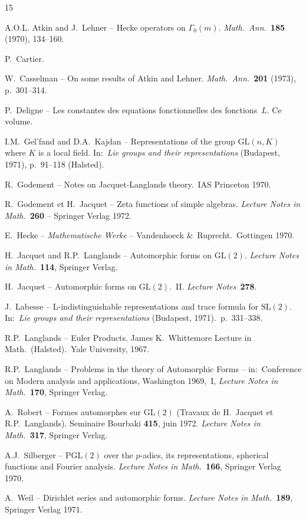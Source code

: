 \documentclass[12pt]{amsart}
\begin{document}
\begin{thebibliography}{15}

A.O.L. Atkin and J.~Lehner -- Hecke operators on $\Gamma_0(m)$.
\textit{Math.\ Ann.}\ \textbf{185} (1970), 134--160.

P.~Cartier.

W.~Casselman -- On some results of Atkin and Lehner.
\textit{Math.\ Ann.}\ \textbf{201} (1973), p.\ 301--314.

P.~Deligne -- Les constantes des equations fonctionnelles des fonctions~$L$.
Ce volume.

I.M.~Gel'fand and D.A.~Kajdan -- Representations of the group $\mathrm{GL}(n,K)$ where $K$ is a local field.
In:\ \textit{Lie groups and their representations} (Budapest, 1971), p.\ 91--118 (Halsted).

R.~Godement -- Notes on Jacquet-Langlands theory.\ IAS Princeton 1970.

R.~Godement et H.~Jacquet -- Zeta functions of simple algebras.
\textit{Lecture Notes in Math.}\ \textbf{260} -- Springer Verlag 1972.

E.~Hecke -- \textit{Mathematische Werke} -- Vandenhoeck \&\ Ruprecht.\ Gottingen 1970.

H.~Jacquet and R.P.~Langlands -- Automorphic forms on $\mathrm{GL}(2)$.
\textit{Lecture Notes in Math.}\ \textbf{114}, Springer Verlag.

H.~Jacquet -- Automorphic forms on $\mathrm{GL}(2)$.\ II.
\textit{Lecture Notes}\ \textbf{278}.

J.~Labesse -- L-indistinguishable representations and trace formula for $\mathrm{SL}(2)$.
In:\ \textit{Lie groups and their representations} (Budapest, 1971).\ p.\ 331--338.

R.P.~Langlands -- Euler Products.
James K.~Whittemore Lecture in Math.\ (Halsted).\ Yale University, 1967.

R.P.~Langlands -- Problems in the theory of Automorphic Forms -- in:\ Conference on Modern analysis and applications, Washington 1969,~I,
\textit{Lecture Notes in Math.}\ \textbf{170}, Springer Verlag.

A.~Robert -- Formes automorphes sur $\mathrm{GL}(2)$ (Travaux de H.~Jacquet et R.P.~Langlands).
Seminaire Bourbaki \textbf{415}, juin 1972.
\textit{Lecture Notes in Math.}\ \textbf{317}, Springer Verlag.

A.J.~Silberger -- $\mathrm{PGL}(2)$ over the $p$-adics, its representations, spherical functions and Fourier analysis.
\textit{Lecture Notes in Math.}\ \textbf{166}, Springer Verlag 1970.

A.~Weil -- Dirichlet series and automorphic forms.
\textit{Lecture Notes in Math.}\ \textbf{189}, Springer Verlag 1971.

\end{thebibliography}
\end{document}
